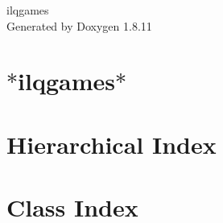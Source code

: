 \documentclass[twoside]{book}
\newcommand{\+}{\discretionary{\mbox{\scriptsize$\hookleftarrow$}}{}{}}
\newcommand{\clearemptydoublepage}{%
  \newpage{\pagestyle{empty}\cleardoublepage}%
}
\begin{document}
\hypersetup{pageanchor=false,
             bookmarksnumbered=true,
             pdfencoding=unicode
            }
\begin{titlepage}
\vspace*{7cm}
\begin{center}%
{\Large ilqgames }\\
\vspace*{1cm}
{\large Generated by Doxygen 1.8.11}\\
\end{center}
\end{titlepage}
\clearemptydoublepage
\tableofcontents
\clearemptydoublepage
{}
\hypersetup{pageanchor=true}

\chapter{$\ast$ilqgames$\ast$}
\label{index}\hypertarget{index}{}
\chapter{Hierarchical Index}

\chapter{Class Index}

\end{document}
